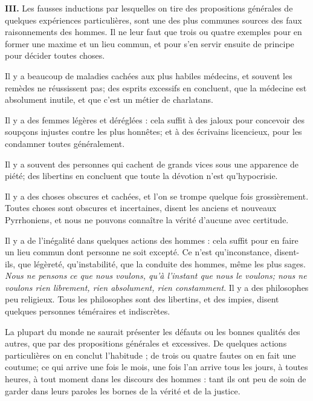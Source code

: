 \bigbreak
{\bfseries\scshape III.} Les fausses inductions par lesquelles on tire des propositions générales de quelques expériences particulières, sont une des plus communes sources des faux raisonnements des hommes. Il ne leur faut que trois ou quatre exemples pour en former une maxime et un lieu commun, et pour s'en servir ensuite de principe pour décider toutes choses.

Il y a beaucoup de maladies cachées aux plus habiles médecins, et souvent les remèdes ne réussissent pas; des esprits excessifs en concluent, que la médecine est absolument inutile, et que c'est un métier de charlatans.

Il y a des femmes légères et déréglées : cela suffit à des jaloux pour concevoir des soupçons injustes contre les plus honnêtes; et à des écrivains licencieux, pour les condamner toutes généralement.

Il y a souvent des personnes qui cachent de grands vices sous une apparence de piété; des libertins en concluent que toute la dévotion n'est qu'hypocrisie.

Il y a des choses obscures et cachées, et l'on se trompe quelque fois grossièrement. Toutes choses sont obscures et incertaines, disent les anciens et nouveaux Pyrrhoniens, et nous ne pouvons connaître la vérité d'aucune avec certitude.

Il y a de l'inégalité dans quelques actions des hommes : cela suffit pour en faire un lieu commun dont personne ne soit excepté. Ce n'est qu'inconstance, disent-ils, que légèreté, qu'instabilité, que la conduite des hommes, même les plus sages. \emph{Nous ne pensons ce que nous voulons, qu'à l'instant que nous le voulons; nous ne voulons rien librement, rien absolument, rien constamment}. Il y a des philosophes peu religieux. Tous les philosophes sont des libertins, et des impies, disent quelques personnes téméraires et indiscrètes.

La plupart du monde ne saurait présenter les défauts ou les bonnes qualités des autres, que par des propositions générales et excessives. De quelques actions particulières on en conclut l'habitude ; de trois ou quatre fautes on en fait une coutume; ce qui arrive une fois le mois, une fois l'an arrive tous les jours, à toutes heures, à tout moment dans les discours des hommes : tant ils ont peu de soin de garder dans leurs paroles les bornes de la vérité et de la justice.

